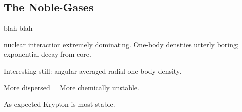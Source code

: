  
 \subsection{The Noble-Gases}
 
 blah blah
 
 nuclear interaction extremely dominating. One-body densities utterly boring; exponential decay from core.
 
 Interesting still: angular averaged radial one-body density.

 More dispersed = More chemically unstable. 
 
 As expected Krypton is most stable.
 
 
\begin{figure}
 \begin{center}
     \\

\end{center}
\end{figure}
